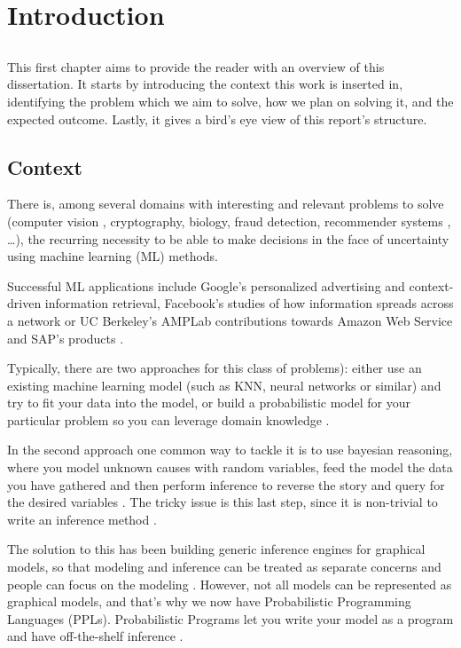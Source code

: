 \chapter{Introduction} \label{chap:intro}

\section*{}

This first chapter aims to provide the reader with an overview of this
dissertation. It starts by introducing the context this work is inserted in,
identifying the problem which we aim to solve, how we plan on solving it, and
the expected outcome. Lastly, it gives a bird's eye view of this report's
structure.

\section{Context} \label{sec:context}

There is, among several domains with interesting and relevant problems to solve
(computer vision \cite{Kulkarni2015}, cryptography, biology, fraud detection,
recommender systems \cite{intml}, …), the recurring necessity to be able to
make decisions in the face of uncertainty using machine learning (ML) methods.

Successful ML applications include Google's personalized advertising and
context-driven information retrieval, Facebook's studies of how information
spreads across a network or UC Berkeley's AMPLab contributions towards Amazon
Web Service and SAP's products \cite{Broder:2015:BDN:2684822.2697027}.

Typically, there are two approaches for this class of problems): either use an
existing machine learning model (such as KNN, neural networks or similar) \cite{mlnot} and
try to fit your data into the model, or build a probabilistic model for your
particular problem so you can leverage domain knowledge \cite{SciPy}.

In the second approach one common way to tackle it is to use bayesian reasoning,
where you model unknown causes with random variables, feed the model the data you
have gathered and then perform inference to reverse the story and query for the
desired variables \cite{thbay}. The tricky issue is this last step, since it is non-trivial
to write an inference method \cite{Duvenaud}.

The solution to this has been building generic inference engines for graphical
models, so that modeling and inference can be treated as separate concerns and
people can focus on the modeling \cite{Jordan1996}. However, not all models can be represented as
graphical models, and that’s why we now have Probabilistic Programming Languages
(PPLs). Probabilistic Programs let you write your model as a program and have
off-the-shelf inference \cite{Prekopa2003}.

